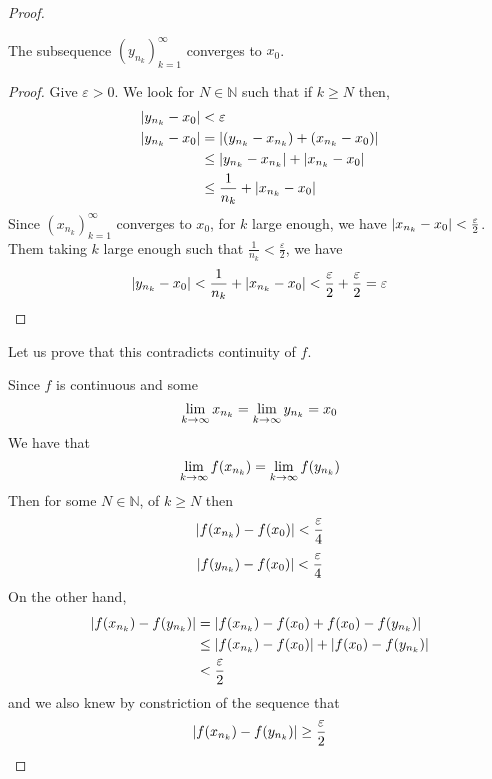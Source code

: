 \documentclass[12pt]{report}
\begin{document}
\begin{proof}
        \begin{claim}
            The subsequence \(\left(y_{n_k}\right)^\infty _{k=1}\) converges to \(x_0\).
            \begin{proof}
                Give \(\varepsilon >0\). We look for \(N \in \mathbb{N}\) such that if \(k \geq N\) then,
                \begin{align*}
                    \left| y_{n_k} - x_0 \right| &< \varepsilon\\
                    \left| y_{n_k} - x_0 \right| &= \left| \left(y_{n_k} - x_{n_k}\right) + \left(x_{n_k} - x_0\right) \right|\\
                    &\leq \left| y_{n_k} - x_{n_k} \right| + \left| x_{n_k} - x_0 \right|\\
                    &\leq \frac{1}{n_k} + \left| x_{n_k} - x_0 \right|
                \end{align*}
                Since \(\left(x_{n_k}\right)^\infty _{k=1}\) converges to \(x_0\), for \(k\) large enough, we have \(\left| x_{n_k} - x_0 \right|< \frac{\varepsilon}{2}\). Them taking \(k\) large enough such that \(\frac{1}{n_k} < \frac{\varepsilon}{2}\), we have
                \[\left| y_{n_k} - x_0 \right| < \frac{1}{n_k} + \left| x_{n_k} - x_0 \right| < \frac{\varepsilon}{2} + \frac{\varepsilon}{2} = \varepsilon\]
            \end{proof}
        \end{claim}

        Let us prove that this contradicts continuity of \(f\).

        Since \(f\) is continuous and some 
        \[\lim_{k \to \infty} x_{n_k} = \lim_{k \to \infty} y_{n_k} = x_0\]
        We have that
        \[\lim_{k \to \infty} f(x_{n_k}) = \lim_{k \to \infty} f(y_{n_k})\]
        Then for some \(N \in \mathbb{N}\), of \(k \geq N\) then
        \[\left| f(x_{n_k}) - f(x_0) \right| < \frac{\varepsilon}{4}\]
        \[\left| f(y_{n_k}) - f(x_0) \right| < \frac{\varepsilon}{4}\]
        On the other hand,
        \begin{align*}
            \left| f(x_{n_k}) - f(y_{n_k}) \right| &= \left| f(x_{n_k}) - f(x_0) + f(x_0) - f(y_{n_k}) \right|\\
            &\leq \left| f(x_{n_k}) - f(x_0) \right| + \left| f(x_0) - f(y_{n_k}) \right|\\
            &< \frac{\varepsilon}{2}
        \end{align*}
        and we also knew by constriction of the sequence that 
        \[\left| f(x_{n_k}) - f(y_{n_k}) \right| \geq \frac{\varepsilon}{2}\]
    \end{proof}
    \setcounter{section}{12}
\end{document}
